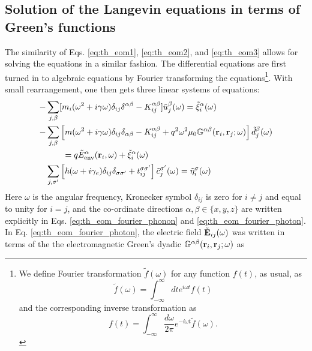 \subsection{Solution of the Langevin equations in terms of Green's functions}
\label{sec:th_eom_solution}
The similarity of Eqs. \eqref{eq:th_eom1}, \eqref{eq:th_eom2}, and \eqref{eq:th_eom3} allows for solving the equations in a similar fashion. The differential equations are first turned in to algebraic equations by Fourier transforming the equations\footnote{We define Fourier transformation $\tilde f(\omega)$ for any function $f(t)$, as usual, as
\begin{equation}
 \tilde f(\omega) = \int_{-\infty}^{\infty} dt e^{i\omega t} f(t) \label{eq:th_fourier}
\end{equation}
and the corresponding inverse transformation as
\begin{equation}
 f(t) = \int_{-\infty}^{\infty} \frac{d\omega}{2\pi} e^{-i\omega t}\tilde f(\omega). \label{eq:th_fourier_inv}
\end{equation}}.
With small rearrangement, one then gets three linear systems of equations:
\begin{subequations}
\begin{align}
   - & \sum_{j,\beta}  [m_i (\omega^2+i\gamma \omega) \delta_{ij}\delta^{\alpha\beta} - K_{ij}^{\alpha\beta}] \tilde{u}_j^{\beta}(\omega) = \tilde \xi_i^{\alpha}(\omega) \label{eq:th_eom_fourier_phonon} \\
  - &  \sum_{j,\beta} \left[m(\omega^2+i\gamma\omega) \delta_{ij}\delta_{\alpha\beta} - K_{ij}^{\alpha\beta} +q^2 \omega^2 \mu_0 \mathbb{G}^{\alpha\beta}(\mathbf{r}_i,\mathbf{r}_j;\omega) \right]\tilde{d}_j^{\beta}(\omega) \notag \\
  & \qquad = q\tilde{E}_{\textrm{env}}^{\alpha}(\mathbf{r}_i,\omega) + \tilde{\xi}^{\alpha}_i(\omega) \label{eq:th_eom_fourier_photon} \\ 
  &  \sum_{j,\sigma'} \left[\hbar (\omega+i\gamma_e) \delta_{ij}\delta_{\sigma\sigma'} + t_{ij}^{\sigma\sigma'} \right] \tilde c_j^{\sigma'}(\omega) = \tilde \eta_i^{\sigma}(\omega)   \label{eq:th_eom_fourier_electron}
\end{align}
\end{subequations}
Here $\omega$ is the angular frequency, Kronecker symbol $\delta_{ij}$ is zero for $i\neq j$ and equal to unity for $i=j$, and the co-ordinate directions $\alpha,\beta \in \{x,y,z\}$ are written explicitly in Eqs. \eqref{eq:th_eom_fourier_phonon} and \eqref{eq:th_eom_fourier_photon}. In Eq. \eqref{eq:th_eom_fourier_photon}, the electric field $\tilde{\mathbf{E}}_{ij}(\omega)$ was written in terms of the the electromagnetic Green's dyadic $\mathbb{G}^{\alpha\beta}(\mathbf{r}_i,\mathbf{r}_j;\omega)$ as \cite{novotny}
